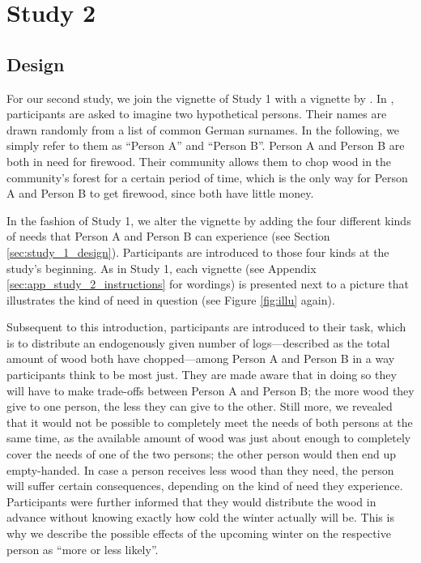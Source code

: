 \documentclass[egregdoesnotlikesansseriftitles]{scrartcl}
\begin{document}
\section{Study 2}\label{sec:study_2}
\subsection{Design}
For our second study, we join the vignette of Study 1 with a vignette by \cite{bauer_need_2022}.
In \cite{bauer_need_2022}, participants are asked to imagine two hypothetical persons.
Their names are drawn randomly from a list of common German surnames.
In the following, we simply refer to them as ``Person A'' and ``Person B''.
Person A and Person B are both in need for firewood.
Their community allows them to chop wood in the community's forest for a certain period of time, which is the only way for Person A and Person B to get firewood, since both have little money.

In the fashion of Study 1, we alter the vignette by adding the four different kinds of needs that Person A and Person B can experience (see Section \ref{sec:study_1_design}).
Participants are introduced to those four kinds at the study's beginning.
As in Study 1, each vignette (see Appendix \ref{sec:app_study_2_instructions} for wordings) is presented next to a picture that illustrates the kind of need in question (see Figure \ref{fig:illu} again).

Subsequent to this introduction, participants are introduced to their task, which is to distribute an endogenously given number of logs---described as the total amount of wood both have chopped---among Person A and Person B in a way participants think to be most just.
They are made aware that in doing so they will have to make trade-offs between Person A and Person B; the more wood they give to one person, the less they can give to the other.
Still more, we revealed that it would not be possible to completely meet the needs of both persons at the same time, as the available amount of wood was just about enough to completely cover the needs of one of the two persons; the other person would then end up empty-handed.
In case a person receives less wood than they need, the person will suffer certain consequences, depending on the kind of need they experience.
Participants were further informed that they would distribute the wood in advance without knowing exactly how cold the winter actually will be.
This is why we describe the possible effects of the upcoming winter on the respective person as ``more or less likely''.
\end{document}
